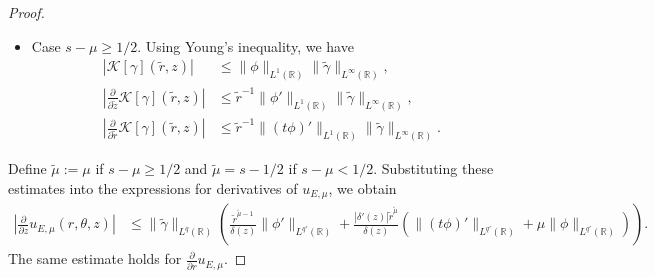 \documentclass[10pt,a4paper]{amsart}
\newcommand{\R}{\mathbb{R}}
\renewcommand{\d}{\delta}
\newcommand{\g}{\gamma}
\newcommand{\p}{\partial}
\renewcommand{\t}{\theta}
\begin{document}
\begin{proof}
\begin{itemize}
                \begin{align*}
                    \left|\mathcal{K}[\g](\widetilde{r},z)\right| &\leq \widetilde{r}^{-1/q} \|\phi\|_{L^{q'}(\R)} \|\widetilde{\g}\|_{L^q(\R)}=\widetilde{r}^{(s-\mu)-1/2} \|\phi\|_{L^{q'}(\R)} \|\widetilde{\g}\|_{L^q(\R)},\\
                    \left|\frac{\p}{\p \widetilde{z}}\mathcal{K}[\g](\widetilde{r},z)\right| &\leq \widetilde{r}^{(s-\mu)-3/2} \|\phi'\|_{L^{q'}(\R)} \|\widetilde{\g}\|_{L^q(\R)},\\
                    \left|\frac{\p}{\p \widetilde{r}}\mathcal{K}[\g](\widetilde{r},z)\right| &\leq \widetilde{r}^{(s-\mu)-3/2} \|(t\phi)'\|_{L^{q'}(\R)} \|\widetilde{\g}\|_{L^q(\R)}.
                \end{align*}
                \item Case $s-\mu\geq 1/2$. Using Young's inequality, we have
                \begin{align*}
                    |\mathcal{K}[\g](\widetilde{r},z)| &\leq \|\phi\|_{L^1(\R)} \|\widetilde{\g}\|_{L^\infty(\R)},\\
                    \left|\frac{\p}{\p \widetilde{z}}\mathcal{K}[\g](\widetilde{r},z)\right| &\leq \widetilde{r}^{-1} \|\phi'\|_{L^1(\R)} \|\widetilde{\g}\|_{L^\infty(\R)},\\
                    \left|\frac{\p}{\p \widetilde{r}}\mathcal{K}[\g](\widetilde{r},z)\right| &\leq \widetilde{r}^{-1} \|(t\phi)'\|_{L^1(\R)} \|\widetilde{\g}\|_{L^\infty(\R)}.
                \end{align*}
            \end{itemize}
            Define $\widetilde{\mu}:=\mu$ if $s-\mu\geq 1/2$ and $\widetilde{\mu}=s-1/2$ if $s-\mu<1/2$. Substituting these estimates into the expressions for derivatives of $u_{E,\mu}$, we obtain
            \begin{align*}
                \left|\frac{\p}{\p z} u_{E,\mu}(r,\t,z)\right| &\leq \|\widetilde{\g}\|_{L^q(\R)} \left(\frac{\widetilde{r}^{\widetilde{\mu}-1}}{\d(z)} \|\phi'\|_{L^{q'}(\R)} + \frac{|\d'(z)| \widetilde{r}^{\widetilde{\mu}}}{\d(z)}(\|(t\phi)'\|_{L^{q'}(\R)}+\mu \|\phi\|_{L^{q'}(\R)})\right).
            \end{align*}
            The same estimate holds for $\frac{\p}{\p r} u_{E,\mu}$.


\end{proof}
\end{document}
